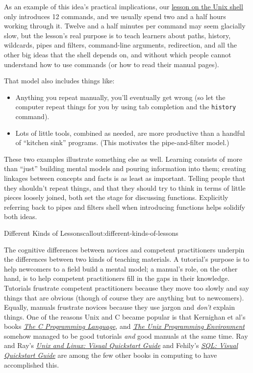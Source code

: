 As an example of this idea's practical implications, our
\href{http://swcarpentry.github.io/shell-novice/}{lesson on the Unix
shell} only introduces 12 commands, and we usually spend two and a half
hours working through it. Twelve and a half minutes per command may seem
glacially slow, but the lesson's real purpose is to teach learners about
paths, history, wildcards, pipes and filters, command-line arguments,
redirection, and all the other big ideas that the shell depends on, and
without which people cannot understand how to use commands (or how to
read their manual pages).

That model also includes things like:

\begin{itemize}
\item
  Anything you repeat manually, you'll eventually get wrong (so let the
  computer repeat things for you by using tab completion and the
  \texttt{history} command).
\item
  Lots of little tools, combined as needed, are more productive than a
  handful of ``kitchen sink'' programs. (This motivates the
  pipe-and-filter model.)
\end{itemize}

These two examples illustrate something else as well. Learning consists
of more than ``just'' building mental models and pouring information
into them; creating linkages between concepts and facts is as least as
important. Telling people that they shouldn't repeat things, and that
they should try to think in terms of little pieces loosely joined, both
set the stage for discussing functions. Explicitly referring back to
pipes and filters shell when introducing functions helps solidify both
ideas.

\begin{callout}{Different Kinds of Lessons}{callout:different-kinds-of-lessons}

The cognitive differences between novices and competent practitioners
underpin the differences between two kinds of teaching materials. A
tutorial's purpose is to help newcomers to a field build a mental model;
a manual's role, on the other hand, is to help competent practitioners
fill in the gaps in their knowledge. Tutorials frustrate competent
practitioners because they move too slowly and say things that are
obvious (though of course they are anything but to newcomers). Equally,
manuals frustrate novices because they use jargon and \emph{don't}
explain things. One of the reasons Unix and C became popular is that
Kernighan et al's books
\emph{\href{http://www.amazon.com/Programming-Language-Brian-W-Kernighan/dp/0131103628/}{The
C Programming Language}}, and
\emph{\href{http://www.amazon.com/Unix-Programming-Environment-Prentice-Hall-Software/dp/013937681X/}{The
Unix Programming Environment}} somehow managed to be good tutorials
\emph{and} good manuals at the same time. Ray and Ray's
\emph{\href{http://www.amazon.com/Unix-Linux-Visual-QuickStart-Guide/dp/0321997549/}{Unix
and Linux: Visual Quickstart Guide}} and Fehily's
\emph{\href{http://www.amazon.com/SQL-Visual-QuickStart-Guide-3rd/dp/0321553578/}{SQL:
Visual Quickstart Guide}} are among the few other books in computing to
have accomplished this.
\end{callout}

